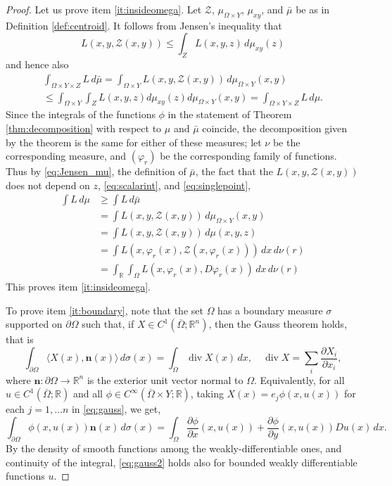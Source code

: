 \documentclass{article}
\newcommand{\R}{\mathbb{R}}
\theoremstyle{definition}
\theoremstyle{remark}
\begin{document}
\begin{proof}
Let us prove item \ref{it:insideomega}. Let $\mathcal Z$, $\mu_{\Omega\times Y}$, $\mu_{xy}$, and $\bar \mu$ be as in Definition \ref{def:centroid}.
It follows from Jensen's inequality that
\begin{equation}\label{eq:jensenarg}
    L(x,y,\mathcal Z(x,y))\leq \int_{Z} L(x,y,z)\,d\mu_{xy}(z)
\end{equation}
and hence also
\begin{multline}\label{eq:Jensen_mu}
\int_{\Omega\times Y\times Z} L\,d\bar\mu=\int_{\Omega\times Y} L(x,y,\mathcal Z(x,y))\,d\mu_{\Omega\times Y}(x,y)\\\leq \int_{\Omega\times Y}\int_Z L(x,y,z)d\mu_{xy}(z)d\mu_{\Omega\times Y}(x,y)=\int_{\Omega\times Y\times Z} L\,d\mu.
\end{multline}
Since the integrals of the functions $\phi$ in the statement of Theorem \ref{thm:decomposition} with respect to $\mu$ and $\bar\mu$ coincide,
%
the decomposition given by the theorem is the same for either of these measures; let $\nu$ be the corresponding measure, and $(\varphi_r)$ be the corresponding family of  functions. 
%
%
%
%
%
%
%
%
Thus by \eqref{eq:Jensen_mu}, the definition of $\bar\mu$, the fact that the $L(x,y,\mathcal Z(x,y))$ does not depend on $z$, \eqref{eq:scalarint}, and \eqref{eq:singlepoint},
\begin{align*}
 \int L\,d\mu&\geq \int L\,d\bar\mu\\
 &=\int L(x,y,\mathcal Z(x,y))\,d\mu_{\Omega\times Y}(x,y)\\
 &=\int L(x,y,\mathcal Z(x,y))\,d\mu(x,y,z)\\
 &=\int L(x,\varphi_r(x),\mathcal Z(x,\varphi_r(x)))\,dx\,d\nu(r)\\
 &=
 \int_\R\int_\Omega L(x,\varphi_r(x),D\varphi_r(x))\,dx\,d\nu(r)
\end{align*}
This proves item \ref{it:insideomega}.

 To prove item \ref{it:boundary}, note that the set $\Omega$ has a boundary measure  $\sigma$ supported on $\partial \Omega$ such that, if $X\in C^1(\overline\Omega;\R^n)$, then the Gauss theorem holds, that is
\begin{equation}\label{eq:gauss}
 \int_{\partial \Omega}\langle X(x),\mathbf n(x)\rangle\,d\sigma(x)=\int_\Omega\operatorname{div} X(x)\,dx,\quad \operatorname{div} X=\sum_i\frac{\partial X_i}{\partial x_i},
\end{equation}
where $\mathbf n\colon\partial\Omega\to\R^n$ is the exterior unit vector normal to $\Omega$.
Equivalently, for all $u\in C^1(\overline\Omega;\R)$ and all $\phi\in C^\infty(\overline\Omega\times Y;\R)$, taking $X(x)=e_j\phi(x,u(x))$ for each $j=1,\dots n$ in \eqref{eq:gauss}, we get,
\begin{equation}\label{eq:gauss2}
 \int_{\partial \Omega}
 \phi(x,u(x))\mathbf n(x)\,d\sigma(x)=\int_\Omega\frac{\partial\phi}{\partial x}(x,u(x))
 +\frac{\partial\phi}{\partial y}(x,u(x))Du(x)\,dx.
\end{equation}
By the density of smooth functions among the weakly-differentiable ones, and continuity of the integral, \eqref{eq:gauss2} holds also for bounded weakly differentiable functions $u$. 


\end{proof}
\end{document}
